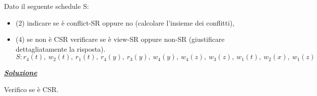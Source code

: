 \documentclass[a4paper]{article}
\begin{document}
	Dato il seguente schedule S:
	\begin{itemize}
		\item (2) indicare se è conflict-SR oppure no (calcolare l'insieme dei conflitti),
		
		\item (4) se non è CSR verificare se è view-SR oppure non-SR (giustificare dettagliatamente la risposta).
		\begin{equation*}
			S: r_{4}\left(t\right), \: w_{2}\left(t\right), \: r_{1}\left(t\right), \: r_{4}\left(y\right), \: r_{3}\left(y\right), \: w_{4}\left(y\right), \: w_{4}\left(z\right), \: w_{3}\left(z\right), \: w_{1}\left(t\right), \: w_{2}\left(x\right), \: w_{1}\left(z\right)
		\end{equation*}
	\end{itemize}
	
	\noindent
	\textcolor{Green4}{\textbf{\emph{\underline{Soluzione}}}}\newline
	
	\noindent
	Verifico se è CSR.\newline
\end{document}
